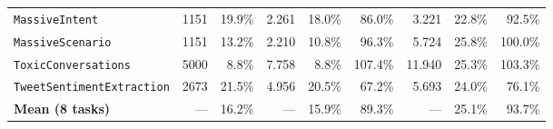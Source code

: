 \begin{table}[t]
\begin{tabular}{lr|rrrr|rrr}
\texttt{MassiveIntent} & 1151 & 19.9\% & 2.261 & 18.0\% & 86.0\% & 3.221 & 22.8\% & 92.5\% \\
\texttt{MassiveScenario} & 1151 & 13.2\% & 2.210 & 10.8\% & 96.3\% & 5.724 & 25.8\% & 100.0\% \\
\texttt{ToxicConversations} & 5000 & 8.8\% & 7.758 & 8.8\% & 107.4\% & 11.940 & 25.3\% & 103.3\% \\
\texttt{TweetSentimentExtraction} & 2673 & 21.5\% & 4.956 & 20.5\% & 67.2\% & 5.693 & 24.0\% & 76.1\% \\
\midrule
\textbf{Mean (8 tasks)} & --- & 16.2\% & --- & 15.9\% & 89.3\% & --- & 25.1\% & 93.7\% \\
\bottomrule \end{tabular} \end{table}
